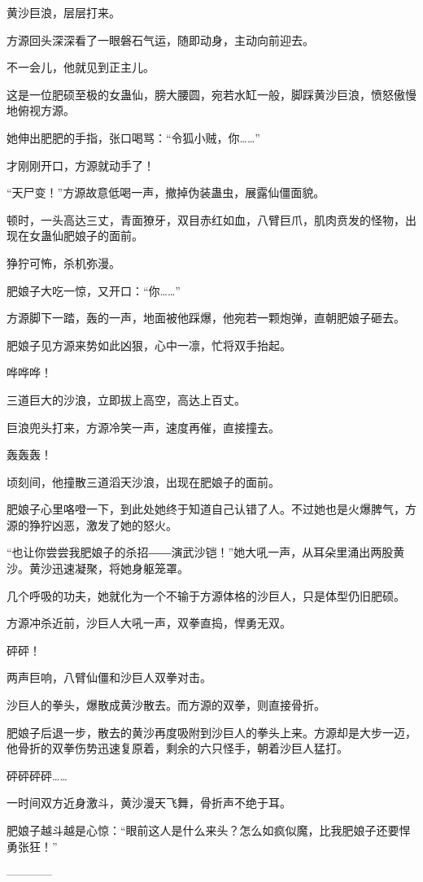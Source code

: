 \begin{this_body}
黄沙巨浪，层层打来。

方源回头深深看了一眼磐石气运，随即动身，主动向前迎去。

不一会儿，他就见到正主儿。

这是一位肥硕至极的女蛊仙，膀大腰圆，宛若水缸一般，脚踩黄沙巨浪，愤怒傲慢地俯视方源。

她伸出肥肥的手指，张口喝骂：“令狐小贼，你……”

才刚刚开口，方源就动手了！

“天尸变！”方源故意低喝一声，撤掉伪装蛊虫，展露仙僵面貌。

顿时，一头高达三丈，青面獠牙，双目赤红如血，八臂巨爪，肌肉贲发的怪物，出现在女蛊仙肥娘子的面前。

狰狞可怖，杀机弥漫。

肥娘子大吃一惊，又开口：“你……”

方源脚下一踏，轰的一声，地面被他踩爆，他宛若一颗炮弹，直朝肥娘子砸去。

肥娘子见方源来势如此凶狠，心中一凛，忙将双手抬起。

哗哗哗！

三道巨大的沙浪，立即拔上高空，高达上百丈。

巨浪兜头打来，方源冷笑一声，速度再催，直接撞去。

轰轰轰！

顷刻间，他撞散三道滔天沙浪，出现在肥娘子的面前。

肥娘子心里咯噔一下，到此处她终于知道自己认错了人。不过她也是火爆脾气，方源的狰狞凶恶，激发了她的怒火。

“也让你尝尝我肥娘子的杀招――演武沙铠！”她大吼一声，从耳朵里涌出两股黄沙。黄沙迅速凝聚，将她身躯笼罩。

几个呼吸的功夫，她就化为一个不输于方源体格的沙巨人，只是体型仍旧肥硕。

方源冲杀近前，沙巨人大吼一声，双拳直捣，悍勇无双。

砰砰！

两声巨响，八臂仙僵和沙巨人双拳对击。

沙巨人的拳头，爆散成黄沙散去。而方源的双拳，则直接骨折。

肥娘子后退一步，散去的黄沙再度吸附到沙巨人的拳头上来。方源却是大步一迈，他骨折的双拳伤势迅速复原着，剩余的六只怪手，朝着沙巨人猛打。

砰砰砰砰……

一时间双方近身激斗，黄沙漫天飞舞，骨折声不绝于耳。

肥娘子越斗越是心惊：“眼前这人是什么来头？怎么如疯似魔，比我肥娘子还要悍勇张狂！”

------------

\end{this_body}

